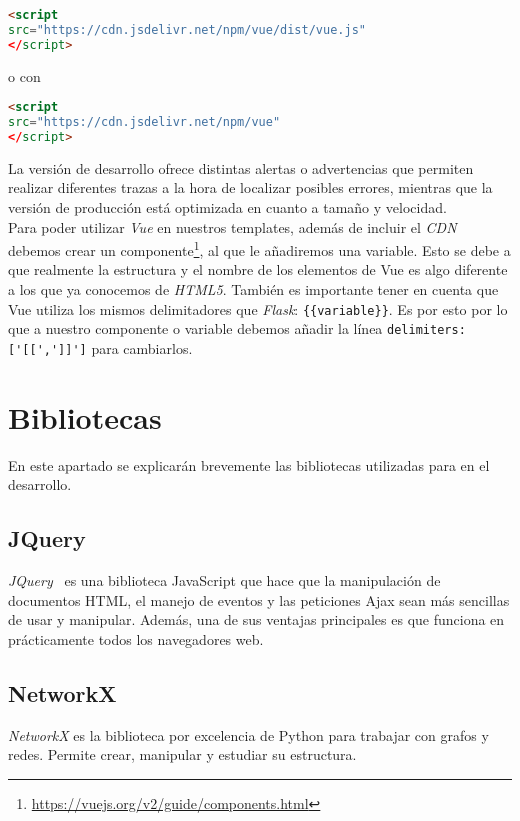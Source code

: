 \renewcommand{\lstlistingname}{Vue.js cdn}%
\renewcommand{\lstlistlistingname}{List of \lstlistingname s}
\begin{lstlisting}[language=html,caption={Versión de desarrollo.}]
<script
src="https://cdn.jsdelivr.net/npm/vue/dist/vue.js"
</script>
\end{lstlisting}
o con
\begin{lstlisting}[language=html,caption={Versión de producción.}]
<script
src="https://cdn.jsdelivr.net/npm/vue"
</script>
\end{lstlisting}
La versión de desarrollo ofrece distintas alertas o advertencias que permiten realizar diferentes trazas a la hora de localizar posibles errores, mientras que la versión de producción está optimizada en cuanto a tamaño y velocidad.
\\
Para poder utilizar \textit{Vue} en nuestros templates, además de incluir el \textit{CDN} debemos crear un componente\footnote{\url{https://vuejs.org/v2/guide/components.html}}, al que le añadiremos una variable. Esto se debe a que realmente la estructura y el nombre de los elementos de Vue es algo diferente a los que ya conocemos de \textit{HTML5}. También es importante tener en cuenta que Vue utiliza los mismos delimitadores que \textit{Flask}: \verb|{{variable}}|. Es por esto por lo que a nuestro componente o variable debemos añadir la línea \verb|delimiters:['[[',']]']| para cambiarlos.


\section{Bibliotecas}
En este apartado se explicarán brevemente las bibliotecas utilizadas para en el desarrollo.

\subsection{JQuery}
\textit{JQuery}~\cite{doc:jquery} es una biblioteca JavaScript que hace que la manipulación de documentos HTML, el manejo de eventos y las peticiones Ajax sean más sencillas de usar y manipular. Además, una de sus ventajas principales es que funciona en prácticamente todos los navegadores web.

\subsection{NetworkX}\label{sub:networkx}
\textit{NetworkX} es la biblioteca por excelencia de Python para trabajar con grafos y redes. Permite crear, manipular y estudiar su estructura.
\\

